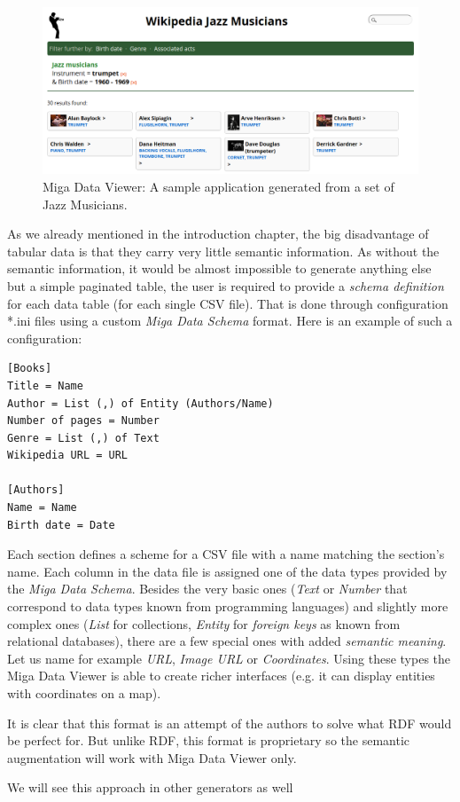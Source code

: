 \begin{figure}
	\centering
	\includegraphics[width=140mm]{img/02_miga_data_viewer.png}
	\caption{Miga Data Viewer: A sample application generated from a set of Jazz Musicians.}
	\label{fig:miga-data-viewer}
\end{figure}

As we already mentioned in the introduction chapter, the big disadvantage of tabular data is that they carry very little semantic information. As without the semantic information, it would be almost impossible to generate anything else but a simple paginated table, the user is required to provide a \emph{schema definition} for each data table (for each single CSV file). That is done through configuration *.ini files using a custom \emph{Miga Data Schema} format. Here is an example of such a configuration:

\scriptsize
\begin{verbatim}
[Books]
Title = Name
Author = List (,) of Entity (Authors/Name)
Number of pages = Number
Genre = List (,) of Text
Wikipedia URL = URL

[Authors]
Name = Name
Birth date = Date
\end{verbatim}
\normalsize

Each section defines a scheme for a CSV file with a name matching the section's name. Each column in the data file is assigned one of the data types provided by the \emph{Miga Data Schema}. Besides the very basic ones (\emph{Text} or \emph{Number} that correspond to data types known from programming languages) and slightly more complex ones (\emph{List} for collections, \emph{Entity} for \emph{foreign keys} as known from relational databases), there are a few special ones with added \emph{semantic meaning}. Let us name for example \emph{URL}, \emph{Image URL} or \emph{Coordinates}. Using these types the Miga Data Viewer is able to create richer interfaces (e.g. it can display entities with coordinates on a map).

It is clear that this format is an attempt of the authors to solve what RDF would be perfect for. But unlike RDF, this format is proprietary so the semantic augmentation will work with Miga Data Viewer only.

We will see this approach in other generators as well